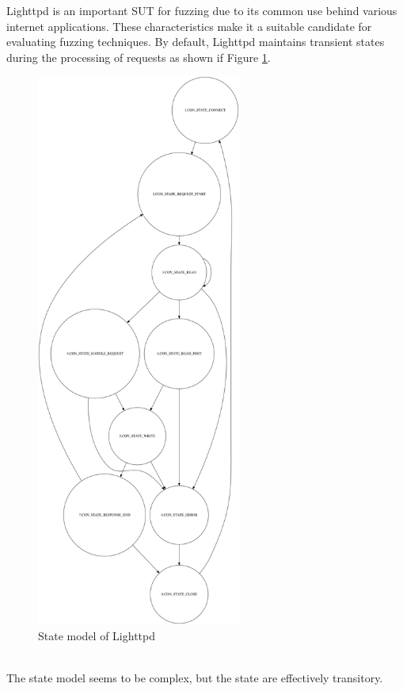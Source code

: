 Lighttpd is an important SUT for fuzzing due to its common use behind various internet applications.
These characteristics make it a suitable candidate for evaluating fuzzing techniques.
By default, Lighttpd maintains transient states during the processing of requests  as shown if Figure \ref{fig:lighttpdstatemodel}.
\begin{figure}[H]
    \centering
    \includegraphics[width=0.6\textwidth]{Images/lighttpd_original.png}
    \caption{State model of Lighttpd}
    \label{fig:lighttpdstatemodel}
\end{figure}
\phantom{}\\
The state model seems to be complex, but the state are effectively transitory.
